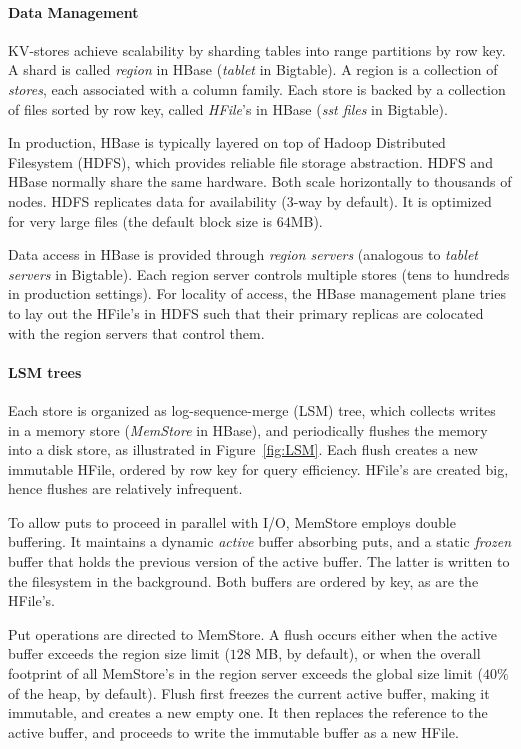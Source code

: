 \paragraph{Data Management}
KV-stores achieve scalability by sharding tables into range partitions by row key. 
A shard is called {\em region\/} in HBase (\emph{tablet} in Bigtable). 
A region is a collection of \emph{stores}, each associated with a column family. 
Each store is backed by a collection of files sorted by row key, called \emph{HFile}'s in HBase 
(\emph{sst files} in Bigtable). 

In production, HBase is typically layered on top of Hadoop Distributed Filesystem (HDFS), 
which provides reliable file storage abstraction. HDFS and HBase normally share the same hardware. 
Both scale horizontally to thousands of nodes. HDFS replicates data for availability (3-way by default). 
It is optimized for very large files (the default block size is $64$MB).

Data access in HBase is provided through {\em region servers} (analogous to {\em tablet servers}
in Bigtable). Each region server controls multiple stores (tens to hundreds in production settings). 
For locality of access, the HBase management plane tries to lay out the HFile's in HDFS such that 
their primary replicas are colocated with the region servers that control them. 

\paragraph{LSM trees}
Each store is organized as log-sequence-merge (LSM) tree, which collects writes in a memory store 
(\emph{MemStore} in HBase), and periodically flushes the memory into a disk store, as illustrated in 
Figure~\ref{fig:LSM}. Each flush creates a new immutable HFile, ordered by row key for query efficiency. 
HFile's are created big, hence flushes are relatively infrequent. 

To allow puts to proceed in parallel with I/O, MemStore employs double buffering. 
It maintains a dynamic \emph{active} buffer absorbing puts, and a static \emph{frozen}
buffer that holds the previous version of the active buffer. The latter is written to the 
filesystem in the background. Both buffers are ordered by key, as are the HFile's.  

Put operations are directed to MemStore. A flush occurs either when the active buffer 
exceeds the region size limit ($128$ MB, by default), or when the overall footprint of all MemStore's
in the region server exceeds the global size limit ($40\%$ of the heap, by default). 
Flush first freezes the current active buffer, making it immutable, and creates a new empty one.
It then replaces the reference to the active buffer, and proceeds to write the immutable buffer 
as a new HFile. 

